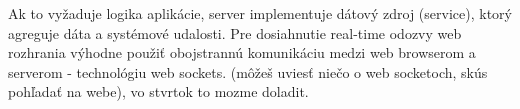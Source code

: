 Ak to vyžaduje logika aplikácie, server implementuje dátový zdroj (service), ktorý agreguje dáta a systémové udalosti. Pre dosiahnutie real-time odozvy web rozhrania výhodne použiť obojstrannú komunikáciu medzi web browserom a serverom - technológiu web sockets. (môžeš uviesť niečo o web socketoch, skús pohľadať na webe), vo stvrtok to mozme doladit.
